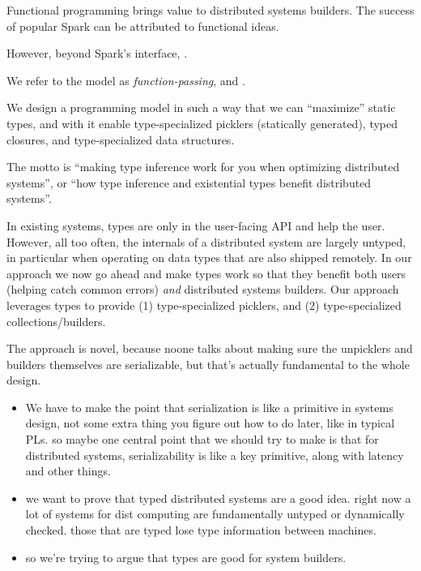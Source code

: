 \documentclass[preprint]{sigplanconf}
\theoremstyle{definition}
\theoremstyle{definition}
\begin{document}
Functional programming brings value to distributed systems builders. The
success of popular Spark can be attributed to functional ideas.

However, beyond Spark's interface, .

We refer to the model as {\em function-passing}, and .


We design a programming model in such a way that we can ``maximize'' static
types, and with it enable type-specialized picklers (statically generated),
typed closures, and type-specialized data structures.

The motto is ``making type inference work for you when optimizing distributed
systems'', or ``how type inference and existential types benefit distributed
systems''.

In existing systems, types are only in the user-facing API and help the user.
However, all too often, the internals of a distributed system are largely
untyped, in particular when operating on data types that are also shipped
remotely. In our approach we now go ahead and make types work so that they
benefit both users (helping catch common errors) \emph{and} distributed
systems builders. Our approach leverages types to provide (1) type-specialized
picklers, and (2) type-specialized collections/builders.

The approach is novel, because noone talks about making sure the unpicklers
and builders themselves are serializable, but that's actually fundamental to
the whole design.

\begin{itemize}

\item We have to make the point that serialization is like a primitive in
systems design, not some extra thing you figure out how to do later, like in
typical PLs. so maybe one central point that we should try to make is that
for distributed systems, serializability is like a key primitive, along with
latency and other things.

\item we want to prove that typed distributed systems are a good idea. right
now a lot of systems for dist computing are fundamentally untyped or
dynamically checked. those that are typed lose type information between
machines.

\item so we're trying to argue that types are good for system builders.

\end{itemize}
\end{document}
